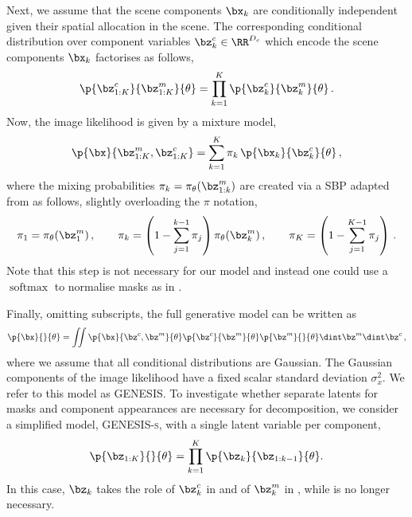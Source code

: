 \documentclass{article}
\begin{document}
Next, we assume that the scene components $\bx_k$ are conditionally independent given their spatial allocation in the scene.
The corresponding conditional distribution over component variables \mbox{$\bz^c_k \in \RR^{D_c}$} which encode the scene components $\bx_k$ factorises as follows,
\begin{equation}
    \p{\bz^c_{1:K}}{\bz^m_{1:K}}{\theta} = \prod_{k=1}^K \p{\bz^c_k}{\bz^m_k}{\theta}\,. \label{eq:conditional_appearance}
\end{equation}
Now, the image likelihood is given by a mixture model,
\begin{equation}
    \p{\bx}{\bz^m_{1:K}, \bz^c_{1:K}} = \sum_{k=1}^K \pi_k\, \p{\bx_k}{\bz^c_k}{\theta}\,, \label{eq:gauss_mixture}
\end{equation}
where the mixing probabilities $\pi_k = \operatorname{\pi_\theta} (\bz^m_{1:k})$ are created via a \gls{SBP} adapted from \citet{burgess2019monet} as follows, slightly overloading the $\pi$ notation,
\begin{equation}
    \pi_1 = \operatorname{\pi_\theta} (\bz^m_1)\,,
    \qquad
    \pi_k = \left(1 - \sum_{j=1}^{k-1} \pi_j \right) \operatorname{\pi_\theta} (\bz^m_k)\,,
    \qquad
    \pi_K = \left(1 - \sum_{j=1}^{K-1} \pi_j \right)
    \,. \label{eq:sbp}
\end{equation}
Note that this step is not necessary for our model and instead one could use a $\operatorname{softmax}$ to normalise masks as in \citet{greff2019multi}. 

Finally, omitting subscripts, the full generative model can be written as
\begin{equation}
    \p{\bx}{}{\theta} = \iint \p{\bx}{\bz^c,\bz^m}{\theta} \p{\bz^c}{\bz^m}{\theta} \p{\bz^m}{}{\theta} \dint \bz^m \dint \bz^c\,,
\end{equation}
where we assume that all conditional distributions are Gaussian.
The Gaussian components of the image likelihood have a fixed scalar standard deviation $\sigma^2_x$.
We refer to this model as \gls{GENESIS}.
To investigate whether separate latents for masks and component appearances are necessary for decomposition, we consider a simplified model, \gls{GENESIS}\textsc{-s}, with a single latent variable per component,
\begin{equation}
	\p{\bz_{1:K}}{}{\theta} = \prod_{k=1}^K \p{\bz_k}{\bz_{1:k-1}}{\theta}.
\end{equation}
In this case, $\bz_k$ takes the role of $\bz_k^c$ in  and of $\bz_k^m$ in , while  is no longer necessary.
\end{document}
